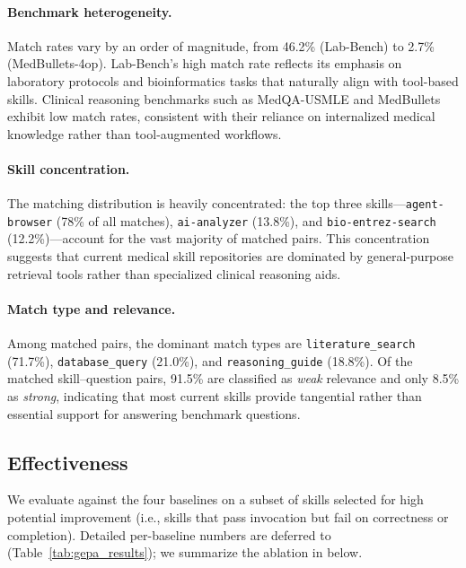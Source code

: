 \paragraph{Benchmark heterogeneity.}
Match rates vary by an order of magnitude, from 46.2\% (Lab-Bench) to 2.7\% (MedBullets-4op).
Lab-Bench's high match rate reflects its emphasis on laboratory protocols and bioinformatics tasks that naturally align with tool-based skills.
Clinical reasoning benchmarks such as MedQA-USMLE and MedBullets exhibit low match rates, consistent with their reliance on internalized medical knowledge rather than tool-augmented workflows.

\paragraph{Skill concentration.}
The matching distribution is heavily concentrated: the top three skills---\texttt{agent-browser} (78\% of all matches), \texttt{ai-analyzer} (13.8\%), and \texttt{bio-entrez-search} (12.2\%)---account for the vast majority of matched pairs.
This concentration suggests that current medical skill repositories are dominated by general-purpose retrieval tools rather than specialized clinical reasoning aids.

\paragraph{Match type and relevance.}
Among matched pairs, the dominant match types are \texttt{literature\_search} (71.7\%), \texttt{database\_query} (21.0\%), and \texttt{reasoning\_guide} (18.8\%).
Of the matched skill--question pairs, 91.5\% are classified as \emph{weak} relevance and only 8.5\% as \emph{strong}, indicating that most current skills provide tangential rather than essential support for answering benchmark questions.

\subsection{\gepamed Effectiveness}
\label{ssec:gepa_results}

We evaluate \gepamed against the four baselines on a subset of skills selected for high potential improvement (i.e., skills that pass invocation but fail on correctness or completion).
Detailed per-baseline numbers are deferred to  (Table~\ref{tab:gepa_results}); we summarize the ablation in  below.

